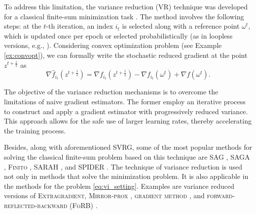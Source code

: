 \documentclass{article}
\begin{document}
To address this limitation, the variance reduction (VR) technique was developed for a classical finite-sum minimization task \citep{johnson2013accelerating}. The method involves the following steps: at the $t$-th iteration, an index $i_t$ is selected along with a reference point $\omega^t$, which is updated once per epoch or selected probabilistically (as in loopless versions, e.g., \citep{kovalev2020don}). Considering convex optimization problem (see Example \ref{ex:convopt}), we can formally write the stochastic reduced gradient at the point $z^{t+\frac{1}{2}}$ as
\begin{equation*}
    \nabla\hat{f}_{i_t} (z^{t+\frac{1}{2}}) = \nabla f_{i_t} (z^{t+\frac{1}{2}}) - \nabla f_{i_t} (\omega^t) + \nabla f (\omega^t).
\end{equation*} 
\vspace{-4mm}

The objective of the variance reduction mechanisms is to overcome the limitations of naive gradient estimators. The former employ an iterative process to construct and apply a gradient estimator with progressively reduced variance. This approach allows for the safe use of larger learning rates, thereby accelerating the training process. 

Besides, along with aforementioned \textsc{SVRG}, some of the most popular methods for solving the classical finite-sum problem based on this technique are \textsc{SAG} \citep{roux2012stochastic}, \textsc{SAGA} \citep{defazio2014saga}, \textsc{Finito} \citep{defazio2014finito}, \textsc{SARAH} \citep{nguyen2017sarah, hu2019efficient}, and \textsc{SPIDER} \citep{fang2018spider}. The technique of variance reduction is used not only in methods that solve the minimization problem. It is also applicable in the methods for the problem \eqref{eq:vi_setting}. Examples are variance reduced versions of \textsc{Extragradient}, \textsc{Mirror-prox} \citep{alacaoglu2022stochastic}, \textsc{gradient method} \citep{palaniappan2016stochastic}, and \textsc{forward-reflected-backward (FoRB)} \citep{alacaoglu2021forward}.
\end{document}

